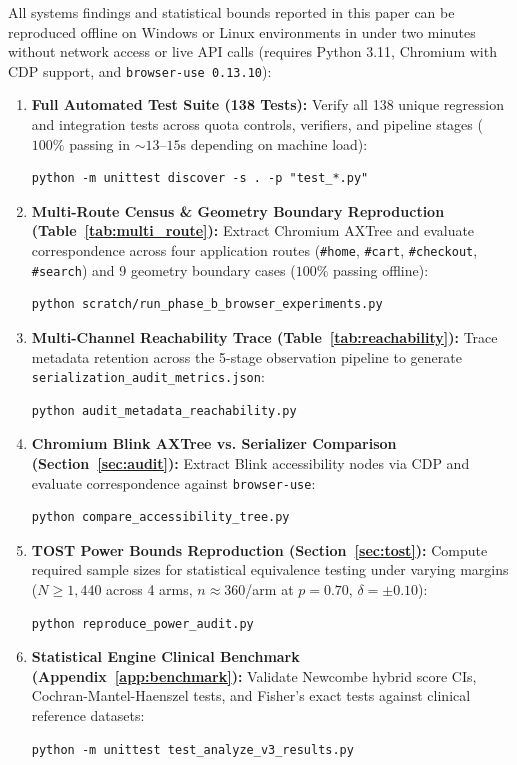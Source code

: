 \documentclass[11pt,a4paper]{article}
\begin{document}
All systems findings and statistical bounds reported in this paper can be reproduced offline on Windows or Linux environments in under two minutes without network access or live API calls (requires Python 3.11, Chromium with CDP support, and \texttt{browser-use 0.13.10}):
\begin{enumerate}
    \item \textbf{Full Automated Test Suite (138 Tests):}
    Verify all 138 unique regression and integration tests across quota controls, verifiers, and pipeline stages ($100\%$ passing in $\sim 13$--$15$s depending on machine load):
\begin{lstlisting}
python -m unittest discover -s . -p "test_*.py"
\end{lstlisting}

    \item \textbf{Multi-Route Census \& Geometry Boundary Reproduction (Table~\ref{tab:multi_route}):}
    Extract Chromium AXTree and evaluate correspondence across four application routes (\texttt{\#home}, \texttt{\#cart}, \texttt{\#checkout}, \texttt{\#search}) and 9 geometry boundary cases ($100\%$ passing offline):
\begin{lstlisting}
python scratch/run_phase_b_browser_experiments.py
\end{lstlisting}

    \item \textbf{Multi-Channel Reachability Trace (Table~\ref{tab:reachability}):}
    Trace metadata retention across the 5-stage observation pipeline to generate \texttt{serialization\_audit\_metrics.json}:
\begin{lstlisting}
python audit_metadata_reachability.py
\end{lstlisting}

    \item \textbf{Chromium Blink AXTree vs. Serializer Comparison (Section~\ref{sec:audit}):}
    Extract Blink accessibility nodes via CDP and evaluate correspondence against \texttt{browser-use}:
\begin{lstlisting}
python compare_accessibility_tree.py
\end{lstlisting}

    \item \textbf{TOST Power Bounds Reproduction (Section~\ref{sec:tost}):}
    Compute required sample sizes for statistical equivalence testing under varying margins ($N \ge 1,440$ across 4 arms, $n \approx 360$/arm at $p=0.70$, $\delta = \pm 0.10$):
\begin{lstlisting}
python reproduce_power_audit.py
\end{lstlisting}

    \item \textbf{Statistical Engine Clinical Benchmark (Appendix~\ref{app:benchmark}):}
    Validate Newcombe hybrid score CIs, Cochran-Mantel-Haenszel tests, and Fisher's exact tests against clinical reference datasets:
\begin{lstlisting}
python -m unittest test_analyze_v3_results.py
\end{lstlisting}
\end{enumerate}
\end{document}
